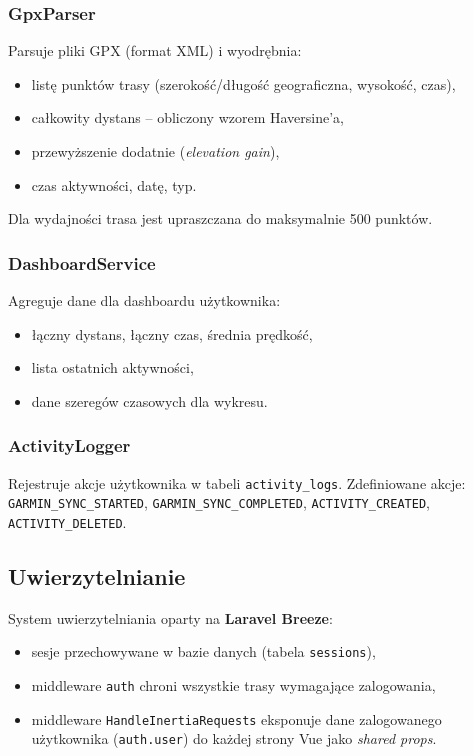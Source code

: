 \documentclass[12pt,a4paper]{report}
\begin{document}
\subsubsection{GpxParser}

Parsuje pliki GPX (format XML) i wyodrębnia:
\begin{itemize}[noitemsep]
    \item listę punktów trasy (szerokość/długość geograficzna, wysokość, czas),
    \item całkowity dystans -- obliczony wzorem Haversine'a,
    \item przewyższenie dodatnie (\textit{elevation gain}),
    \item czas aktywności, datę, typ.
\end{itemize}
Dla wydajności trasa jest upraszczana do maksymalnie 500 punktów.

\subsubsection{DashboardService}

Agreguje dane dla dashboardu użytkownika:
\begin{itemize}[noitemsep]
    \item łączny dystans, łączny czas, średnia prędkość,
    \item lista ostatnich aktywności,
    \item dane szeregów czasowych dla wykresu.
\end{itemize}

\subsubsection{ActivityLogger}

Rejestruje akcje użytkownika w tabeli \texttt{activity\_logs}. Zdefiniowane akcje:
\texttt{GARMIN\_SYNC\_STARTED}, \texttt{GARMIN\_SYNC\_COMPLETED}, \texttt{ACTIVITY\_CREATED}, \texttt{ACTIVITY\_DELETED}.

\subsection{Uwierzytelnianie}

System uwierzytelniania oparty na \textbf{Laravel Breeze}:
\begin{itemize}[noitemsep]
    \item sesje przechowywane w bazie danych (tabela \texttt{sessions}),
    \item middleware \texttt{auth} chroni wszystkie trasy wymagające zalogowania,
    \item middleware \texttt{HandleInertiaRequests} eksponuje dane zalogowanego użytkownika (\texttt{auth.user}) do każdej strony Vue jako \textit{shared props}.
\end{itemize}
\end{document}
